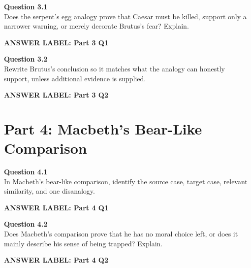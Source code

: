 \documentclass[12pt]{article}
\newcommand{\answerbox}[2]{%
\vspace{0.12em}
\noindent\textbf{#1}\par
\vspace{0.04em}
\noindent\fbox{%
\begin{minipage}[t][#2]{\dimexpr\textwidth-2\fboxsep-2\fboxrule}
\rule{\textwidth}{0pt}
\vspace{#2}
\end{minipage}}
\par\vspace{0.22em}}
\begin{document}
\textbf{Question 3.1}\\[-0.15em]
Does the serpent's egg analogy prove that Caesar must be killed, support only a narrower warning, or merely decorate Brutus's fear? Explain.

\answerbox{ANSWER LABEL: Part 3 Q1}{2.55in}

\textbf{Question 3.2}\\[-0.15em]
Rewrite Brutus's conclusion so it matches what the analogy can honestly support, unless additional evidence is supplied.

\answerbox{ANSWER LABEL: Part 3 Q2}{2.35in}

\newpage

\section*{Part 4: Macbeth's Bear-Like Comparison}

\textbf{Question 4.1}\\[-0.15em]
In Macbeth's bear-like comparison, identify the source case, target case, relevant similarity, and one disanalogy.

\answerbox{ANSWER LABEL: Part 4 Q1}{2.45in}

\textbf{Question 4.2}\\[-0.15em]
Does Macbeth's comparison prove that he has no moral choice left, or does it mainly describe his sense of being trapped? Explain.

\answerbox{ANSWER LABEL: Part 4 Q2}{2.45in}
\end{document}
